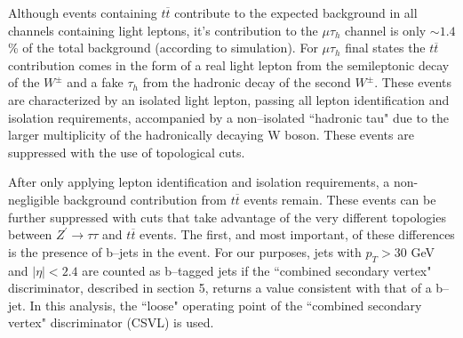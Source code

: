 Although events containing $t\overline{t}$ contribute to the expected background in all channels containing light leptons, it's contribution to the $\mu\tau_{h}$ 
channel is only $\sim 1.4$\% of the total background (according to simulation). For $\mu\tau_{h}$ final states the 
$t\overline{t}$ contribution comes in the form of a real light lepton from the semileptonic decay of the
$W^\pm$ and a fake $\tau_{h}$ from the hadronic decay of the second $W^\pm$. These events are characterized by an isolated light lepton, passing all lepton 
identification and isolation requirements, accompanied by a non--isolated ``hadronic tau" due to the
larger multiplicity of the hadronically decaying W boson. 
These events are suppressed with the use of topological cuts.

After only applying lepton identification and isolation requirements, a non-negligible background contribution from $t\overline{t}$ events remain. These events 
can be further suppressed with cuts that take advantage of the very different topologies between $Z^\prime\to\tau\tau$ and $t\overline{t}$ events. The first, and most 
important, of these differences is the presence of b--jets in the event. 
For our purposes, jets with 
$p_{T} > 30$ GeV and $|\eta| < 2.4$ are counted as b--tagged jets if the ``combined secondary vertex" discriminator, described in section 5, 
returns a value consistent with that of a b--jet. 
In this analysis, the ``loose" operating point of the ``combined secondary vertex" 
discriminator (CSVL) is used. 

